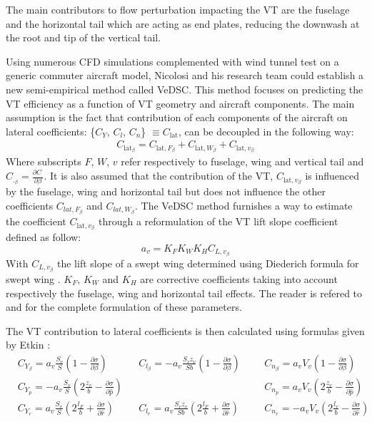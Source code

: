 The main contributors to flow perturbation impacting the VT are the fuselage and the horizontal tail which are acting as end plates, reducing the downwash at the root and tip of the vertical tail. 

Using numerous CFD simulations complemented with wind tunnel test on a generic commuter aircraft model, Nicolosi and his research team could establish a new semi-empirical method called VeDSC. This method focuses on predicting the VT efficiency as a function of VT geometry and aircraft components. The main assumption is the fact that contribution of each components of the aircraft on lateral coefficients: \{$C_{Y}$, $C_{l}$, $C_{n}$\} $\equiv C_{\textrm{lat}}$, can be decoupled in the following way:
\begin{eqnarray}
C_{\textrm{lat}_\beta} = C_{\textrm{lat},F_\beta} + C_{\textrm{lat},W_\beta} + C_{\textrm{lat},v_\beta}
\end{eqnarray}
Where subscripts $F$, $W$, $v$ refer respectively to fuselage, wing and vertical tail and $C_{._\beta}=\frac{\partial C_.}{\partial \beta}$. It is also assumed that the contribution of the VT, $C_{\textrm{lat},v_\beta}$ is influenced by the fuselage, wing and horizontal tail but does not influence the other coefficients $C_{lat,F_\beta}$ and $C_{lat,W_\beta}$.
The VeDSC method furnishes a way to estimate the coefficient $C_{\textrm{lat},v_\beta}$ through a reformulation of the VT lift slope coefficient defined as follow:
\begin{equation}
a_v=K_F K_W K_H C_{L,v_\beta}
\end{equation}
With $C_{L,v_\beta}$ the lift slope of a swept wing determined using Diederich formula for swept wing \cite{DiederichPlanformParameter}. $K_F$, $K_W$ and $K_H$ are corrective coefficients taking into account respectively the fuselage, wing and horizontal tail effects. The reader is refered to \cite{NicolosiVTDesignReview} and \cite{NicolosiDirectionalStabilityReviewofEmpiricalMethod} for the complete formulation of these parameters.

The VT contribution to lateral coefficients is then calculated using formulas given by Etkin \cite{Etkin}:
\begin{align}
&C_{Y_\beta} = a_v\frac{S_v}{S}\left( 1-\frac{\partial \sigma}{\partial \beta}\right) 
&&C_{l_\beta} =-a_v\frac{S_v z_v}{S b}\left( 1-\frac{\partial \sigma}{\partial \beta}\right) 
&&&C_{n_\beta} = a_v V_v\left( 1-\frac{\partial \sigma}{\partial \beta}\right)\\
&C_{Y_p} = -a_v\frac{S_v}{S}\left(2\frac{z_v}{b}-\frac{\partial \sigma}{\partial \hat{p}}\right) && \qquad &&&C_{n_p}= a_v V_v\left(2\frac{z_v}{b}-\frac{\partial \sigma}{\partial \hat{p}}\right)\\
&C_{Y_r} = a_v\frac{S_v}{S}\left( 2\frac{l_F}{b}+\frac{\partial \sigma}{\partial \hat{r}}\right)  &&C_{l_r} =a_v\frac{S_v z_v}{S b}\left( 2\frac{l_F}{b}+\frac{\partial \sigma}{\partial \hat{r}}\right) &&&C_{n_r} = -a_v V_v\left( 2\frac{l_v}{b}-\frac{\partial \sigma}{\partial \hat{r}}\right)
\end{align}

